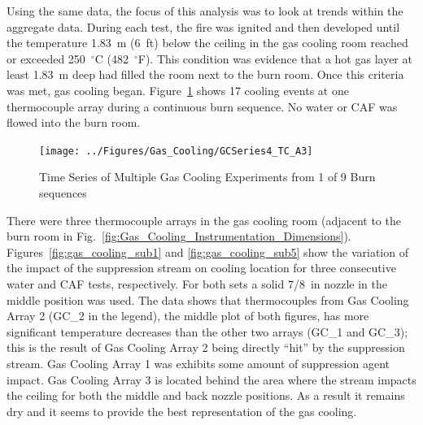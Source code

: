 \documentclass[12pt,oneside]{book}
\begin{document}
Using the same data, the focus of this analysis was to look at trends within the aggregate data. During each test, the fire was ignited and then developed until the temperature 1.83~m (6~ft) below the ceiling in the gas cooling room reached or exceeded 250~$^{\circ}$C (482~$^{\circ}$F).  This condition was evidence that a hot gas layer at least 1.83~m deep had filled the room next to the burn room.  Once this criteria was met, gas cooling began. Figure~\ref{fig:gas_cooling_exp4} shows 17 cooling events at one thermocouple array during a continuous burn sequence.  No water or CAF was flowed into the burn room.   

\begin{figure}[ht!]
	\texttt{[image: ../Figures/Gas\_Cooling/GCSeries4\_TC\_A3]}
	\caption{Time Series of Multiple Gas Cooling Experiments from 1 of 9 Burn sequences}
	\label{fig:gas_cooling_exp4}
\end{figure}

There were three thermocouple arrays in the gas cooling room (adjacent to the burn room in Fig.~\ref{fig:Gas_Cooling_Instrumentation_Dimensions}). Figures~\ref{fig:gas_cooling_sub1} and \ref{fig:gas_cooling_sub5} show the variation of the impact of the suppression stream on cooling location for three consecutive water and CAF tests, respectively. For both sets a solid 7/8~in nozzle in the middle position was used. The data shows that thermocouples from Gas Cooling Array 2 (GC\_2 in the legend), the middle plot of both figures, has more significant temperature decreases than the other two arrays (GC\_1 and GC\_3); this is the result of Gas Cooling Array 2 being directly ``hit'' by the suppression stream.  Gas Cooling Array 1 was exhibits some amount of suppression agent impact.  Gas Cooling Array 3 is located behind the area where the stream impacts the ceiling for both the middle and back nozzle positions.  As a result it remains dry and it seems to provide the best representation of the gas cooling.   
\end{document}
